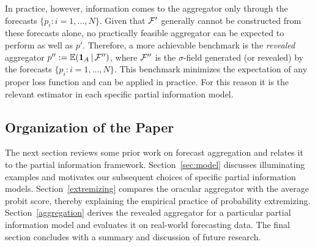 \documentclass[12pt]{article}
\newcommand{\E}{\mathbb{E}}
\theoremstyle{definition}
\theoremstyle{definition}
\def\one{{\bf 1}}
\def\F{{\cal F}}
\def\E{{\mathbb E}}
\def\|{\, | \,}
\begin{document}
In practice, however, information comes to the
aggregator only through the forecasts $\{p_i : i = 1, \dots, N\}$. Given that $\F'$ generally cannot be constructed from these forecasts alone, no practically feasible aggregator can be expected to perform as well as $p'$.  Therefore, a more achievable benchmark is the \textit{revealed} aggregator $p'' := \E (\one_A \|
\F'')$, where $\F''$ is the $\sigma$-field generated (or revealed) by the forecasts
$\{ p_i : i = 1, \dots, N \}$. This benchmark minimizes
the expectation of any proper loss function \citep{Ranjan08} and can be applied in practice. For this reason it is the relevant estimator in each specific partial information model. 





\subsection{Organization of the Paper}

The next section reviews some prior work on forecast aggregation and relates it to the partial information framework.
Section~\ref{sec:model} discusses illuminating examples and
motivates our subsequent choices of specific partial information
models.  Section~\ref{extremizing} compares the oracular aggregator with the average probit score, thereby explaining the
empirical practice of probability extremizing.
Section~\ref{aggregation} derives the revealed aggregator for a
particular partial information model and evaluates it on real-world
forecasting data.  The final section concludes with a summary and discussion of
future research.
\end{document}
